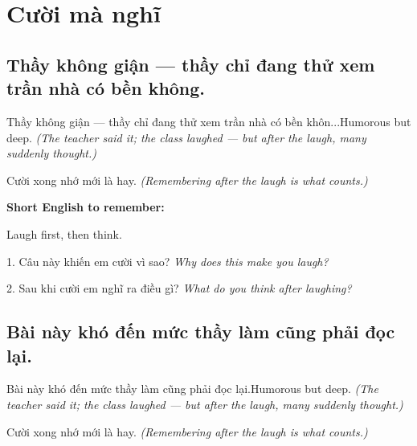 \chapter{Cười mà nghĩ}


\section{Thầy không giận — thầy chỉ đang thử xem trần nhà có bền không.}
\begin{truyen}{Thầy không giận — thầy chỉ đang thử xem trần nhà có bền khôn...}{Humorous but deep.}
\textit{(The teacher said it; the class laughed — but after the laugh, many suddenly thought.)}
\end{truyen}

\begin{baihoc}
Cười xong nhớ mới là hay.
\textit{(Remembering after the laugh is what counts.)}
\end{baihoc}

\begin{ghinhoanh}
\textbf{Short English to remember:}

Laugh first, then think.

\end{ghinhoanh}

\begin{tuhocnhanh}
1. Câu này khiến em cười vì sao? \textit{Why does this make you laugh?}

2. Sau khi cười em nghĩ ra điều gì? \textit{What do you think after laughing?}
\end{tuhocnhanh}
\ngancach


\section{Bài này khó đến mức thầy làm cũng phải đọc lại.}
\begin{truyen}{Bài này khó đến mức thầy làm cũng phải đọc lại.}{Humorous but deep.}
\textit{(The teacher said it; the class laughed — but after the laugh, many suddenly thought.)}
\end{truyen}

\begin{baihoc}
Cười xong nhớ mới là hay.
\textit{(Remembering after the laugh is what counts.)}
\end{baihoc}

